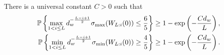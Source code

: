 \begin{lemma}
	\label{lemma:restricted-WL_singular_values}
    There is
	a universal constant $C > 0$ such that
	\begin{subequations}
		\begin{align}
			\mathbb{P}\left\{ {
			\max_{1 < i \leq L}
			d_{w}^{-\frac{L - i + 1}{2}}
			\sigma_{\max}(W_{L:i}(0))
			\leq \frac{6}{5}
			} \right\} & \geq 1 - \exp\left(-\frac{C d_w}{L}\right),
			\label{eq:restricted-WL-sval-ub-unif}
			\\
			\mathbb{P}\left\{ {
			\min_{1 < i \leq L}
			d_{w}^{-\frac{L - i + 1}{2}} \sigma_{\min}(W_{L:i}(0))
			\geq \frac{4}{5}
			} \right\} & \geq 1 - \exp\left(-\frac{C d_w}{L} \right).
			\label{eq:restricted-WL-sval-lb-unif}
		\end{align}
	\end{subequations}
\end{lemma}
